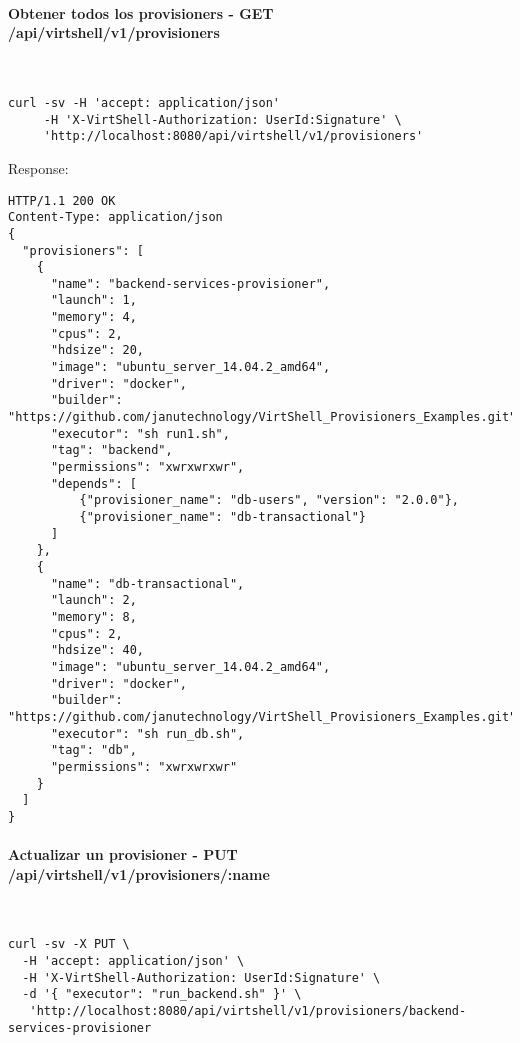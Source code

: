 \paragraph{Obtener todos los provisioners - GET \\ /api/virtshell/v1/provisioners} ~\\

\begin{lstlisting}[style=json]
curl -sv -H 'accept: application/json' 
     -H 'X-VirtShell-Authorization: UserId:Signature' \ 
     'http://localhost:8080/api/virtshell/v1/provisioners'
\end{lstlisting}

Response:

\begin{lstlisting}[style=json]
HTTP/1.1 200 OK
Content-Type: application/json
{
  "provisioners": [
    {
      "name": "backend-services-provisioner",
      "launch": 1,
      "memory": 4,
      "cpus": 2,
      "hdsize": 20,
      "image": "ubuntu_server_14.04.2_amd64",
      "driver": "docker",
      "builder": "https://github.com/janutechnology/VirtShell_Provisioners_Examples.git",
      "executor": "sh run1.sh",
      "tag": "backend",
      "permissions": "xwrxwrxwr",
      "depends": [
          {"provisioner_name": "db-users", "version": "2.0.0"},
          {"provisioner_name": "db-transactional"}
      ]
    },
    {
      "name": "db-transactional",
      "launch": 2,
      "memory": 8,
      "cpus": 2,
      "hdsize": 40,
      "image": "ubuntu_server_14.04.2_amd64",
      "driver": "docker",
      "builder": "https://github.com/janutechnology/VirtShell_Provisioners_Examples.git",
      "executor": "sh run_db.sh",
      "tag": "db",
      "permissions": "xwrxwrxwr"
    }
  ]
}
\end{lstlisting}

\paragraph{Actualizar un provisioner - PUT \\ /api/virtshell/v1/provisioners/:name} ~\\

\begin{lstlisting}[style=json]
curl -sv -X PUT \
  -H 'accept: application/json' \
  -H 'X-VirtShell-Authorization: UserId:Signature' \
  -d '{ "executor": "run_backend.sh" }' \
   'http://localhost:8080/api/virtshell/v1/provisioners/backend-services-provisioner
\end{lstlisting}

